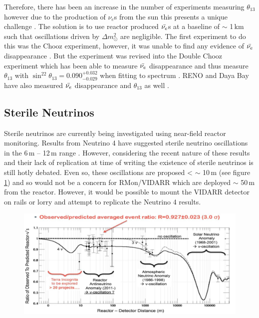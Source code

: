 Therefore, there has been an increase in the number of experiments measuring $\theta_{13}$ however due to the production of $\nu_e$s from the sun this presents a unique challenge \cite{Olive_2014}. The solution is to use reactor produced $\Bar{\nu_e}$s at a baseline of $\sim$ 1\,km such that oscillations driven by $\Delta m_\odot^2$ are negligible. The first experiment to do this was the Chooz experiment, however, it was unable to find any evidence of $\Bar{\nu_e}$ disappearance \cite{Olive_2014}. But the experiment was revised into the Double Chooz experiment which has been able to measure $\Bar{\nu_e}$ disappearance and thus measure $\theta_{13}$ with $\sin^22\theta_{13} = 0.090^{+0.032}_{-0.029}$ when fitting to spectrum \cite{abe2014improved}. RENO and Daya Bay have also measured $\Bar{\nu_e}$ disappearance and $\theta_{13}$ as well \cite{Olive_2014}.  

\subsection{Sterile Neutrinos}
Sterile neutrinos are currently being investigated using near-field reactor monitoring. Results from Neutrino 4 have suggested sterile neutrino oscillations in the 6\,m -- 12\,m range \cite{neutrino4_2021}. However, considering the recent nature of these results and their lack of replication at time of writing the existence of sterile neutrinos is still hotly debated. Even so, these oscillations are proposed < $\sim$ 10\,m \cite{neutrino4_2021} (see figure \ref{fig:neutrino4Plot}) and so would not be a concern for RMon/VIDARR which are deployed $\sim$ 50\,m from the reactor. However, it would be possible to mount the VIDARR detector on rails or lorry and attempt to replicate the Neutrino 4 results. 

\begin{figure}[!h]
 \centering
 \includegraphics[width=0.8\linewidth]{Chapter2/Figs/neutrino4Plot.jpg}
 \label{fig:neutrino4Plot}
\end{figure}

